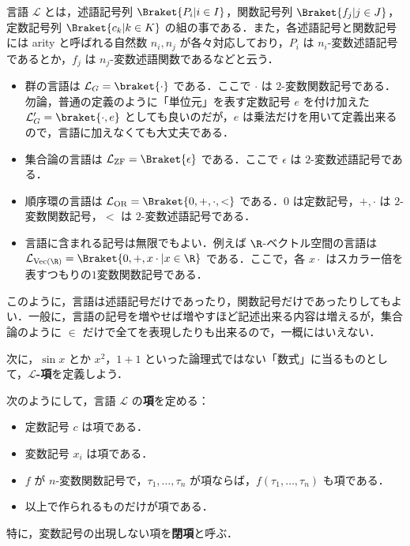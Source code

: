 \documentclass[a4j,xelatex,ja=standard]{ltjsarticle}
\begin{document}
\begin{definition}[言語]
 言語 $\mathcal{L}$ とは，述語記号列 $\Braket{P_i | i \in I}$，関数記号列 $\Braket{f_j | j \in J}$，定数記号列 $\Braket{c_k | k \in K}$ の組の事である．また，各述語記号と関数記号には arity と呼ばれる自然数 $n_i, n_j$ が各々対応しており，$P_i$ は $n_i$-変数述語記号であるとか，$f_j$ は $n_j$-変数述語関数であるなどと云う．
\end{definition}

\begin{example}
 \begin{itemize}
  \item 群の言語は $\mathcal{L}_G = \braket{ \cdot }$ である．ここで $\cdot$ は $2$-変数関数記号である．勿論，普通の定義のように「単位元」を表す定数記号 $e$ を付け加えた $\mathcal{L}_G' = \braket{ \cdot, e }$ としても良いのだが，$e$ は乗法だけを用いて定義出来るので，言語に加えなくても大丈夫である．
  \item 集合論の言語は $\mathcal{L}_{\mathrm{ZF}} = \Braket{ \epsilon }$ である．ここで $\epsilon$ は $2$-変数述語記号である．
  \item 順序環の言語は $\mathcal{L}_{\mathrm{OR}} = \Braket{ 0, +, \cdot, <}$ である．$0$ は定数記号，$+, \cdot$ は $2$-変数関数記号，$<$ は $2$-変数述語記号である．
  \item 言語に含まれる記号は無限でもよい．例えば $\R$-ベクトル空間の言語は $\mathcal{L}_{\mathrm{Vec}(\R)} = \Braket{ 0, +, x\cdot | x \in \R}$ である．ここで，各 $x \cdot$ はスカラー倍を表すつもりの$1$変数関数記号である．
 \end{itemize}
\end{example}

このように，言語は述語記号だけであったり，関数記号だけであったりしてもよい．一般に，言語の記号を増やせば増やすほど記述出来る内容は増えるが，集合論のように $\in$ だけで全てを表現したりも出来るので，一概にはいえない．

次に，$\sin x$ とか $x^2$，$1+1$ といった論理式ではない「数式」に当るものとして，{\bfseries $\mathcal{L}$-項}を定義しよう．

\begin{definition}[項]
 次のようにして，言語 $\mathcal{L}$ の{\bfseries 項}を定める：
 \begin{itemize}
  \item 定数記号 $c$ は項である．
  \item 変数記号 $x_i$ は項である．
  \item $f$ が $n$-変数関数記号で，$\tau_1, \dots, \tau_n$ が項ならば，$f(\tau_1, \dots, \tau_n)$ も項である．
  \item 以上で作られるものだけが項である．
 \end{itemize}
 特に，変数記号の出現しない項を{\bfseries 閉項}と呼ぶ．
\end{definition}
\end{document}
